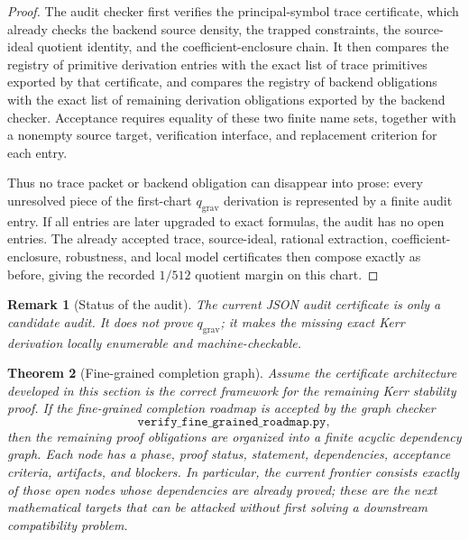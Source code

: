 \documentclass[12pt,a4paper]{article}
\newtheorem{theorem}{Theorem}[section]
\newtheorem{remark}[theorem]{Remark}
\begin{document}
\begin{proof}
The audit checker first verifies the principal-symbol trace certificate, which already checks the backend source density, the trapped constraints, the source-ideal quotient identity, and the coefficient-enclosure chain. It then compares the registry of primitive derivation entries with the exact list of trace primitives exported by that certificate, and compares the registry of backend obligations with the exact list of remaining derivation obligations exported by the backend checker. Acceptance requires equality of these two finite name sets, together with a nonempty source target, verification interface, and replacement criterion for each entry.

Thus no trace packet or backend obligation can disappear into prose: every unresolved piece of the first-chart $q_{\mathrm{grav}}$ derivation is represented by a finite audit entry. If all entries are later upgraded to exact formulas, the audit has no open entries. The already accepted trace, source-ideal, rational extraction, coefficient-enclosure, robustness, and local model certificates then compose exactly as before, giving the recorded $1/512$ quotient margin on this chart.
\end{proof}

\begin{remark}[Status of the audit]
The current JSON audit certificate is only a candidate audit. It does not prove $q_{\mathrm{grav}}$; it makes the missing exact Kerr derivation locally enumerable and machine-checkable.
\end{remark}

\begin{theorem}[Fine-grained completion graph]\label{thm:fine-grained-completion-graph}
Assume the certificate architecture developed in this section is the correct framework for the remaining Kerr stability proof. If the fine-grained completion roadmap is accepted by the graph checker
\[
\texttt{verify\_fine\_grained\_roadmap.py},
\]
then the remaining proof obligations are organized into a finite acyclic dependency graph. Each node has a phase, proof status, statement, dependencies, acceptance criteria, artifacts, and blockers. In particular, the current frontier consists exactly of those open nodes whose dependencies are already proved; these are the next mathematical targets that can be attacked without first solving a downstream compatibility problem.
\end{theorem}
\end{document}
